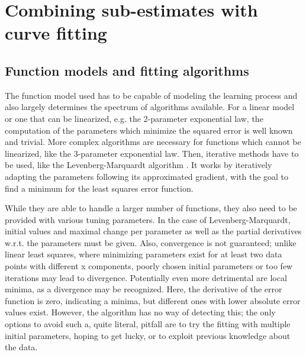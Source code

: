 \section{Combining sub-estimates with curve fitting}

\subsection{Function models and fitting algorithms}
\label{methods:function_models}
The function model used has to be capable of modeling the learning process and also largely determines the spectrum of algorithms available. For a linear model or one that can be linearized, e.g. the 2-parameter exponential law, the computation of the parameters which minimize the squared error is well known and trivial. More complex algorithms are necessary for functions which cannot be linearized, like the 3-parameter exponential law. Then, iterative methods have to be used, like the Levenberg-Marquardt algorithm \cite{Levenberg1944}. It works by iteratively adapting the parameters following its approximated gradient, with the goal to find a minimum for the least squares error function.

While they are able to handle a larger number of functions, they also need to be provided with various tuning parameters. In the case of Levenberg-Marquardt, initial values and maximal change per parameter as well as the partial derivatives w.r.t. the parameters must be given. Also, convergence is not guaranteed; unlike linear least squares, where minimizing parameters exist for at least two data points with different x components, poorly chosen initial parameters or too few iterations may lead to divergence. Potentially even more detrimental are local minima, as a divergence may be recognized. Here, the derivative of the error function is zero, indicating a minima, but different ones with lower absolute error values exist. However, the algorithm has no way of detecting this; the only options to avoid such a, quite literal, pitfall are to try the fitting with multiple initial parameters, hoping to get lucky, or to exploit previous knowledge about the data.

